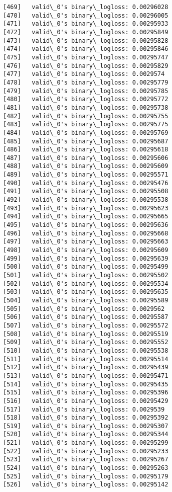 \documentclass[11pt]{article}
\begin{document}
\begin{Verbatim}[commandchars=\\\{\}]
[469]	valid\_0's binary\_logloss: 0.00296028
[470]	valid\_0's binary\_logloss: 0.00296005
[471]	valid\_0's binary\_logloss: 0.00295933
[472]	valid\_0's binary\_logloss: 0.00295849
[473]	valid\_0's binary\_logloss: 0.00295828
[474]	valid\_0's binary\_logloss: 0.00295846
[475]	valid\_0's binary\_logloss: 0.00295747
[476]	valid\_0's binary\_logloss: 0.00295829
[477]	valid\_0's binary\_logloss: 0.0029574
[478]	valid\_0's binary\_logloss: 0.00295779
[479]	valid\_0's binary\_logloss: 0.00295785
[480]	valid\_0's binary\_logloss: 0.00295772
[481]	valid\_0's binary\_logloss: 0.00295738
[482]	valid\_0's binary\_logloss: 0.00295755
[483]	valid\_0's binary\_logloss: 0.00295775
[484]	valid\_0's binary\_logloss: 0.00295769
[485]	valid\_0's binary\_logloss: 0.00295687
[486]	valid\_0's binary\_logloss: 0.00295618
[487]	valid\_0's binary\_logloss: 0.00295606
[488]	valid\_0's binary\_logloss: 0.00295609
[489]	valid\_0's binary\_logloss: 0.00295571
[490]	valid\_0's binary\_logloss: 0.00295476
[491]	valid\_0's binary\_logloss: 0.00295508
[492]	valid\_0's binary\_logloss: 0.00295538
[493]	valid\_0's binary\_logloss: 0.00295623
[494]	valid\_0's binary\_logloss: 0.00295665
[495]	valid\_0's binary\_logloss: 0.00295636
[496]	valid\_0's binary\_logloss: 0.00295668
[497]	valid\_0's binary\_logloss: 0.00295663
[498]	valid\_0's binary\_logloss: 0.00295609
[499]	valid\_0's binary\_logloss: 0.00295639
[500]	valid\_0's binary\_logloss: 0.00295499
[501]	valid\_0's binary\_logloss: 0.00295502
[502]	valid\_0's binary\_logloss: 0.00295534
[503]	valid\_0's binary\_logloss: 0.00295635
[504]	valid\_0's binary\_logloss: 0.00295589
[505]	valid\_0's binary\_logloss: 0.0029562
[506]	valid\_0's binary\_logloss: 0.00295587
[507]	valid\_0's binary\_logloss: 0.00295572
[508]	valid\_0's binary\_logloss: 0.00295519
[509]	valid\_0's binary\_logloss: 0.00295552
[510]	valid\_0's binary\_logloss: 0.00295538
[511]	valid\_0's binary\_logloss: 0.00295514
[512]	valid\_0's binary\_logloss: 0.00295439
[513]	valid\_0's binary\_logloss: 0.00295471
[514]	valid\_0's binary\_logloss: 0.00295435
[515]	valid\_0's binary\_logloss: 0.00295396
[516]	valid\_0's binary\_logloss: 0.00295429
[517]	valid\_0's binary\_logloss: 0.0029539
[518]	valid\_0's binary\_logloss: 0.00295392
[519]	valid\_0's binary\_logloss: 0.00295307
[520]	valid\_0's binary\_logloss: 0.00295344
[521]	valid\_0's binary\_logloss: 0.00295299
[522]	valid\_0's binary\_logloss: 0.00295233
[523]	valid\_0's binary\_logloss: 0.00295267
[524]	valid\_0's binary\_logloss: 0.00295263
[525]	valid\_0's binary\_logloss: 0.00295179
[526]	valid\_0's binary\_logloss: 0.00295142

\end{Verbatim}
\end{document}
